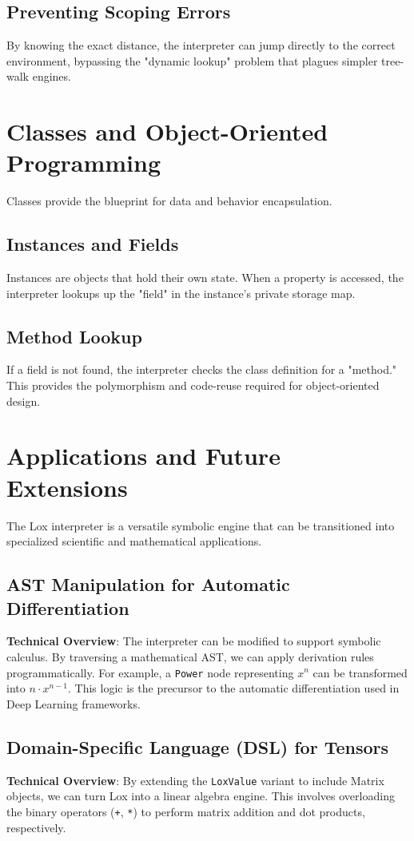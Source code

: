 \documentclass[12pt,a4paper,oneside]{report}
\begin{document}
\section{Preventing Scoping Errors}
By knowing the exact distance, the interpreter can jump directly to the correct environment, bypassing the "dynamic lookup" problem that plagues simpler tree-walk engines.

\chapter{Classes and Object-Oriented Programming}
Classes provide the blueprint for data and behavior encapsulation.

\section{Instances and Fields}
Instances are objects that hold their own state. When a property is accessed, the interpreter lookups up the "field" in the instance's private storage map.

\section{Method Lookup}
If a field is not found, the interpreter checks the class definition for a "method." This provides the polymorphism and code-reuse required for object-oriented design.

\chapter{Applications and Future Extensions}
The Lox interpreter is a versatile symbolic engine that can be transitioned into specialized scientific and mathematical applications.

\section{AST Manipulation for Automatic Differentiation}
\textbf{Technical Overview}: The interpreter can be modified to support symbolic calculus. By traversing a mathematical AST, we can apply derivation rules programmatically. For example, a \texttt{Power} node representing $x^n$ can be transformed into $n \cdot x^{n-1}$. This logic is the precursor to the automatic differentiation used in Deep Learning frameworks.

\section{Domain-Specific Language (DSL) for Tensors}
\textbf{Technical Overview}: By extending the \texttt{LoxValue} variant to include Matrix objects, we can turn Lox into a linear algebra engine. This involves overloading the binary operators (\texttt{+}, \texttt{*}) to perform matrix addition and dot products, respectively.
\end{document}
